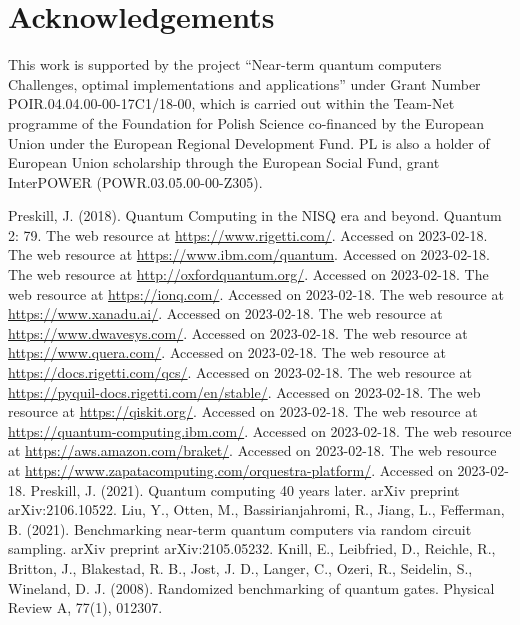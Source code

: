 \documentclass[preprint,12pt, a4paper, dvipsnames]{elsarticle}
\newcommand{\1}{{\rm 1\hspace{-0.9mm}l}}
\theoremstyle{definition}
\begin{document}
\section*{Acknowledgements}

This work is  supported by
the project “Near-term quantum computers Challenges, optimal implementations and applications” under Grant Number POIR.04.04.00-00-17C1/18-00, which is carried out within the Team-Net programme of the Foundation for Polish Science co-financed by the European Union under the European Regional Development Fund.
PL is also a holder of European Union scholarship through the European Social Fund,
grant InterPOWER (POWR.03.05.00-00-Z305).


\begin{thebibliography}{00}
 Preskill, J. (2018). Quantum Computing in the NISQ era and beyond. Quantum 2: 79.
 The web resource at \url{https://www.rigetti.com/}. Accessed on 2023-02-18.
 The web resource at \url{https://www.ibm.com/quantum}. Accessed on 2023-02-18.
 The web resource at \url{http://oxfordquantum.org/}. Accessed on 2023-02-18.
 The web resource at \url{https://ionq.com/}. Accessed on 2023-02-18.
 The web resource at \url{https://www.xanadu.ai/}. Accessed on 2023-02-18.
 The web resource at \url{https://www.dwavesys.com/}. Accessed on 2023-02-18.
 The web resource at \url{https://www.quera.com/}. Accessed on 2023-02-18.
 The web resource at \url{https://docs.rigetti.com/qcs/}. Accessed on 2023-02-18.
 The web resource at \url{https://pyquil-docs.rigetti.com/en/stable/}. Accessed on 2023-02-18.
 The web resource at \url{https://qiskit.org/}. Accessed on 2023-02-18.
 The web resource at \url{https://quantum-computing.ibm.com/}. Accessed on 2023-02-18.
 The web resource at \url{https://aws.amazon.com/braket/}. Accessed on 2023-02-18.
 The web resource at \url{https://www.zapatacomputing.com/orquestra-platform/}. Accessed on 2023-02-18.
 Preskill, J. (2021). Quantum computing 40 years later. arXiv preprint arXiv:2106.10522.
 	Liu, Y., Otten, M., Bassirianjahromi, R., Jiang, L.,  Fefferman, B. (2021). Benchmarking near-term quantum computers via random circuit sampling. arXiv preprint arXiv:2105.05232.
Knill, E., Leibfried, D., Reichle, R., Britton, J., Blakestad, R. B., Jost, J. D., Langer, C., Ozeri, R., Seidelin, S.,  Wineland, D. J. (2008). Randomized benchmarking of quantum gates. Physical Review A, 77(1), 012307.

\end{thebibliography}
\end{document}

